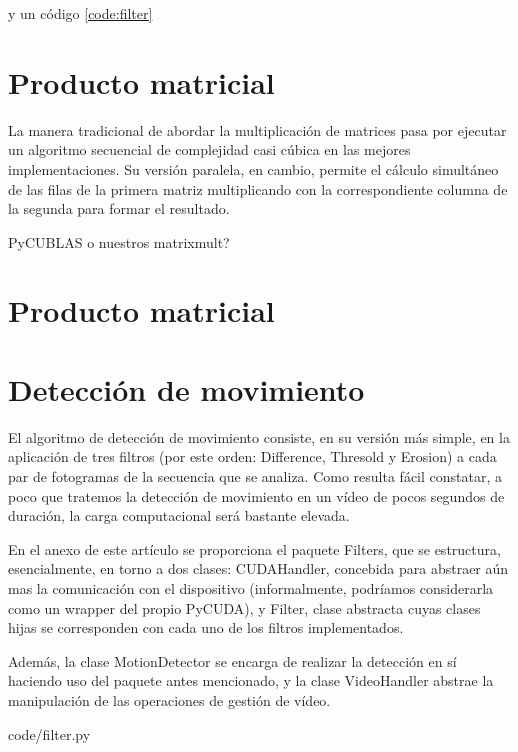 \documentclass[twocolumn,twoside]{Jornadas}
\begin{document}
y un código \ref{code:filter}


\section{Producto matricial}

La manera tradicional de abordar la multiplicaci\'{o}n de matrices pasa por ejecutar un algoritmo secuencial de complejidad casi c\'{u}bica en las mejores implementaciones. Su versi\'{o}n paralela, en cambio, permite el c\'{a}lculo simult\'{a}neo de las filas de la primera matriz multiplicando con la correspondiente columna de la segunda para formar el resultado.

PyCUBLAS o nuestros matrixmult?

\section{Producto matricial}

\section{Detecci\'{o}n de movimiento}

El algoritmo de detecci\'{o}n de movimiento consiste, en su versi\'{o}n m\'{a}s simple, en la aplicaci\'{o}n de tres filtros (por este orden: Difference, Thresold y Erosion) a cada par de fotogramas de la secuencia que se analiza. Como resulta f\'{a}cil constatar, a poco que tratemos la detecci\'{o}n de movimiento en un v\'{i}deo de pocos segundos de duraci\'{o}n, la carga computacional ser\'{a} bastante elevada.

En el anexo de este art\'{i}culo se proporciona el paquete Filters, que se estructura, esencialmente, en torno a dos clases: CUDAHandler, concebida para abstraer a\'{u}n mas la comunicaci\'{o}n con el dispositivo (informalmente, podr\'{i}amos considerarla como un wrapper del propio PyCUDA), y Filter, clase abstracta cuyas clases hijas se corresponden con cada uno de los filtros implementados.

Adem\'{a}s, la clase MotionDetector se encarga de realizar la detecci\'{o}n en s\'{i} haciendo uso del paquete antes mencionado, y la clase VideoHandler abstrae la manipulaci\'{o}n de las operaciones de gesti\'{o}n de v\'{i}deo.

%
   {code/filter.py}



\end{document}
